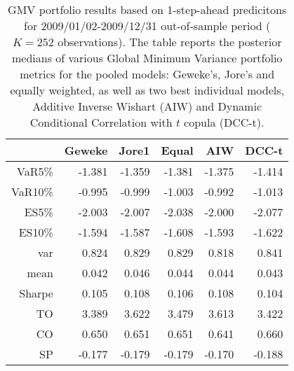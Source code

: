 \begin{table}[ht]
\centering
\caption{GMV portfolio results based on 1-step-ahead predicitons 
             for  2009/01/02-2009/12/31 out-of-sample period ($K=252$ observations).
             The table reports the posterior medians of various Global Minimum
             Variance portfolio metrics for the pooled models: 
             Geweke's, Jore's and equally weighted, 
             as well as two best individual models, Additive Inverse Wishart (AIW) and 
             Dynamic Conditional Correlation with $t$ copula (DCC-t).} 
\label{table:gmvfull}
\begin{tabular}{rrrrrr}
  \hline
 & Geweke & Jore1 & Equal & AIW & DCC-t \\ 
  \hline
VaR5\% & -1.381 & -1.359 & -1.381 & -1.375 & -1.414 \\ 
  VaR10\% & -0.995 & -0.999 & -1.003 & -0.992 & -1.013 \\ 
  ES5\% & -2.003 & -2.007 & -2.038 & -2.000 & -2.077 \\ 
  ES10\% & -1.594 & -1.587 & -1.608 & -1.593 & -1.622 \\ 
  var & 0.824 & 0.829 & 0.829 & 0.818 & 0.841 \\ 
  mean & 0.042 & 0.046 & 0.044 & 0.044 & 0.043 \\ 
  Sharpe & 0.105 & 0.108 & 0.106 & 0.108 & 0.104 \\ 
  TO & 3.389 & 3.622 & 3.479 & 3.613 & 3.422 \\ 
  CO & 0.650 & 0.651 & 0.651 & 0.641 & 0.660 \\ 
  SP & -0.177 & -0.179 & -0.179 & -0.170 & -0.188 \\ 
   \hline
\end{tabular}
\end{table}

